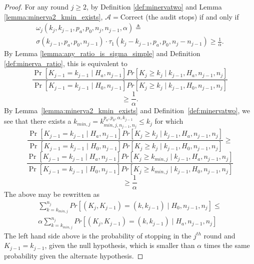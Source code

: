 \begin{proof}
For any round $j\ge 2$, by Definition \ref{def:minervatwo}
and Lemma \ref{lemma:minerva2_kmin_exists},
$\mathcal{A}=\text{Correct}$ (the audit stops) if and only if
\begin{equation*}
\begin{aligned}
\omega_{j}(k_{j}, k_{j-1}, p_a, p_0, n_{j}, n_{j-1}, \alpha )\triangleq\\
\sigma(k_{j-1},p_a,p_0,n_{j-1})\cdot \tau_1(k_{j}-k_{j-1},p_a,p_0,n_j-n_{j-1})
\ge \frac{1}{\alpha}.
\end{aligned}
\end{equation*}
By Lemma \ref{lemma:any_ratio_is_sigma_simple}
and Definition \ref{def:minerva_ratio}, this is equivalent to
$$
\frac{\Pr[K_{j-1} = {k_{j-1}} \mid H_a, n_{j-1}] Pr[K_{j} \ge k_{j} \mid {k_{j-1}}, H_a, n_{j-1}, n_{j}]}{\Pr[K_{j-1} = {k_{j-1}} \mid H_0, n_{j-1}] Pr[K_{j} \ge k_{j} \mid {k_{j-1}}, H_0, n_{j-1}, n_{j}]}
$$$$\ge \frac{1}{\alpha}.
$$
By Lemma~\ref{lemma:minerva2_kmin_exists} and Definition~\ref{def:minervatwo},
we see that there exists a $k_{min, j} = k^{p_a, p_0, \alpha, k_{j-1}}_{min, j, n_{j-1}, n_j}  \leq k_j$ 
for which
$$
\frac{\Pr[K_{j-1} = {k_{j-1}} \mid H_a, n_{j-1}] Pr[K_{j} \ge k_{j} \mid {k_{j-1}}, H_a, n_{j-1}, n_{j}]}{\Pr[K_{j-1} = {k_{j-1}} \mid H_0, n_{j-1}] Pr[K_{j} \ge k_{j} \mid {k_{j-1}}, H_0, n_{j-1}, n_{j}]}\ge
$$
$$
\frac{\Pr[K_{j-1} = {k_{j-1}} \mid H_a, n_{j-1}] Pr[K_{j} \ge k_{min, j} \mid {k_{j-1}}, H_a, n_{j-1}, n_{j}]}{\Pr[K_{j-1} = {k_{j-1}} \mid H_0, n_{j-1}] Pr[K_{j} \ge k_{min, j} \mid {k_{j-1}}, H_0, n_{j-1}, n_{j}]} 
$$$$
\ge 
\frac{1}{\alpha}
$$
The above may be rewritten as
\begin{equation*}
\begin{aligned}
\sum_{{k} = k_{min, j}}^{n_j} Pr[(K_{j} , K_{j-1}) = (k, k_{j-1}) \mid H_0, n_{j-1}, n_{j}] \leq \\
\alpha \sum_{{k} = k_{min, j}}^{n_j} Pr[(K_{j} , K_{j-1}) = (k, k_{j-1}) \mid H_a, n_{j-1}, n_{j}]
\end{aligned}
\end{equation*}
The left hand side above is the probability of stopping in the $j^{th}$ round and $K_{j-1} = k_{j-1}$, given the null hypothesis, which is smaller than $\alpha$ times the same probability given the alternate hypothesis. 

\end{proof}
